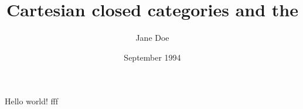 \documentclass{article}
\title{Cartesian closed categories and the}
\author{Jane Doe}
\date{September 1994}
\begin{document}
   \maketitle
   Hello world! fff
\end{document}
